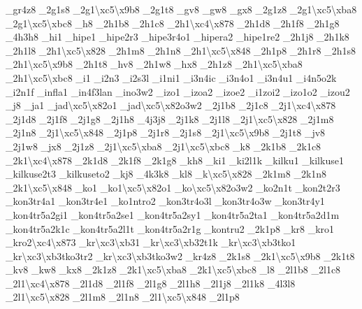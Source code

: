 {\-\_\-gr4z8 \-\_\-2g1s8 \-\_\-2g1\textbackslash{}xc5\textbackslash{}x9b8 \-\_\-2g1t8 \-\_\-gv8 \-\_\-gw8 \-\_\-gx8 \-\_\-2g1z8 \-\_\-2g1\textbackslash{}xc5\textbackslash{}xba8 \-\_\-2g1\textbackslash{}xc5\textbackslash{}xbc8 \-\_\-h8 \-\_\-2h1b8 \-\_\-2h1c8 \-\_\-2h1\textbackslash{}xc4\textbackslash{}x878 \-\_\-2h1d8 \-\_\-2h1f8 \-\_\-2h1g8 \-\_\-4h3h8 \-\_\-hi1 \-\_\-hipe1 \-\_\-hipe2r3 \-\_\-hipe3r4o1 \-\_\-hipera2 \-\_\-hipe1re2 \-\_\-2h1j8 \-\_\-2h1k8 \-\_\-2h1l8 \-\_\-2h1\textbackslash{}xc5\textbackslash{}x828 \-\_\-2h1m8 \-\_\-2h1n8 \-\_\-2h1\textbackslash{}xc5\textbackslash{}x848 \-\_\-2h1p8 \-\_\-2h1r8 \-\_\-2h1s8 \-\_\-2h1\textbackslash{}xc5\textbackslash{}x9b8 \-\_\-2h1t8 \-\_\-hv8 \-\_\-2h1w8 \-\_\-hx8 \-\_\-2h1z8 \-\_\-2h1\textbackslash{}xc5\textbackslash{}xba8 \-\_\-2h1\textbackslash{}xc5\textbackslash{}xbc8 \-\_\-i1 \-\_\-i2n3 \-\_\-i2s3l \-\_\-i1ni1 \-\_\-i3n4ic \-\_\-i3n4o1 \-\_\-i3n4u1 \-\_\-i4n5o2k \-\_\-i2n1f \-\_\-infla1 \-\_\-in4f3lan \-\_\-ino3w2 \-\_\-izo1 \-\_\-izoa2 \-\_\-izoe2 \-\_\-i1zoi2 \-\_\-izo1o2 \-\_\-izou2 \-\_\-j8 \-\_\-ja1 \-\_\-jad\textbackslash{}xc5\textbackslash{}x82o1 \-\_\-jad\textbackslash{}xc5\textbackslash{}x82o3w2 \-\_\-2j1b8 \-\_\-2j1c8 \-\_\-2j1\textbackslash{}xc4\textbackslash{}x878 \-\_\-2j1d8 \-\_\-2j1f8 \-\_\-2j1g8 \-\_\-2j1h8 \-\_\-4j3j8 \-\_\-2j1k8 \-\_\-2j1l8 \-\_\-2j1\textbackslash{}xc5\textbackslash{}x828 \-\_\-2j1m8 \-\_\-2j1n8 \-\_\-2j1\textbackslash{}xc5\textbackslash{}x848 \-\_\-2j1p8 \-\_\-2j1r8 \-\_\-2j1s8 \-\_\-2j1\textbackslash{}xc5\textbackslash{}x9b8 \-\_\-2j1t8 \-\_\-jv8 \-\_\-2j1w8 \-\_\-jx8 \-\_\-2j1z8 \-\_\-2j1\textbackslash{}xc5\textbackslash{}xba8 \-\_\-2j1\textbackslash{}xc5\textbackslash{}xbc8 \-\_\-k8 \-\_\-2k1b8 \-\_\-2k1c8 \-\_\-2k1\textbackslash{}xc4\textbackslash{}x878 \-\_\-2k1d8 \-\_\-2k1f8 \-\_\-2k1g8 \-\_\-kh8 \-\_\-ki1 \-\_\-ki2l1k \-\_\-kilku1 \-\_\-kilkuse1 \-\_\-kilkuse2t3 \-\_\-kilkuseto2 \-\_\-kj8 \-\_\-4k3k8 \-\_\-kl8 \-\_\-k\textbackslash{}xc5\textbackslash{}x828 \-\_\-2k1m8 \-\_\-2k1n8 \-\_\-2k1\textbackslash{}xc5\textbackslash{}x848 \-\_\-ko1 \-\_\-ko1\textbackslash{}xc5\textbackslash{}x82o1 \-\_\-ko\textbackslash{}xc5\textbackslash{}x82o3w2 \-\_\-ko2n1t \-\_\-kon2t2r3 \-\_\-kon3tr4a1 \-\_\-kon3tr4e1 \-\_\-ko1ntro2 \-\_\-kon3tr4o3l \-\_\-kon3tr4o3w \-\_\-kon3tr4y1 \-\_\-kon4tr5a2gi1 \-\_\-kon4tr5a2se1 \-\_\-kon4tr5a2sy1 \-\_\-kon4tr5a2ta1 \-\_\-kon4tr5a2d1m \-\_\-kon4tr5a2k1c \-\_\-kon4tr5a2l1t \-\_\-kon4tr5a2r1g \-\_\-kontru2 \-\_\-2k1p8 \-\_\-kr8 \-\_\-kro1 \-\_\-kro2\textbackslash{}xc4\textbackslash{}x873 \-\_\-kr\textbackslash{}xc3\textbackslash{}xb31 \-\_\-kr\textbackslash{}xc3\textbackslash{}xb32t1k \-\_\-kr\textbackslash{}xc3\textbackslash{}xb3tko1 \-\_\-kr\textbackslash{}xc3\textbackslash{}xb3tko3tr2 \-\_\-kr\textbackslash{}xc3\textbackslash{}xb3tko3w2 \-\_\-kr4z8 \-\_\-2k1s8 \-\_\-2k1\textbackslash{}xc5\textbackslash{}x9b8 \-\_\-2k1t8 \-\_\-kv8 \-\_\-kw8 \-\_\-kx8 \-\_\-2k1z8 \-\_\-2k1\textbackslash{}xc5\textbackslash{}xba8 \-\_\-2k1\textbackslash{}xc5\textbackslash{}xbc8 \-\_\-l8 \-\_\-2l1b8 \-\_\-2l1c8 \-\_\-2l1\textbackslash{}xc4\textbackslash{}x878 \-\_\-2l1d8 \-\_\-2l1f8 \-\_\-2l1g8 \-\_\-2l1h8 \-\_\-2l1j8 \-\_\-2l1k8 \-\_\-4l3l8 \-\_\-2l1\textbackslash{}xc5\textbackslash{}x828 \-\_\-2l1m8 \-\_\-2l1n8 \-\_\-2l1\textbackslash{}xc5\textbackslash{}x848 \-\_\-2l1p8 }
